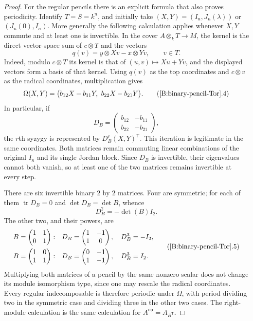 \begin{proof}
For the regular pencils there is an explicit formula that also
proves periodicity.  Identify $T=S=k^n$, and initially take
$(X,Y)=(I_n,J_n(\lambda))$ or $(J_n(0),I_n)$.
More generally the following calculation applies whenever $X,Y$
commute and at least one is invertible.  In the cover
$A\otimes_k T\to M$, the kernel is the direct vector-space sum
of $c\otimes T$ and the vectors
\[
 q(v)=y\otimes Xv-x\otimes Yv,\qquad v\in T.
\]
Indeed, modulo $c\otimes T$ its kernel is that of
$(u,v)\mapsto Xu+Yv$, and the displayed vectors form a basis
of that kernel.  Using $q(v)$ as the top coordinates and
$c\otimes v$ as the radical coordinates, multiplication gives
\[
 \Omega(X,Y)=
 \bigl(b_{12}X-b_{11}Y,\ b_{22}X-b_{21}Y\bigr).             \tag{\ref{B:binary-pencil-Tor}.4}\label{eq:B-binary-regular-syzygy}
\]
In particular, if
\[
 D_B=\begin{pmatrix}b_{12}&-b_{11}\\ b_{22}&-b_{21}\end{pmatrix},
\]
the $r$th syzygy is represented by $D_B^r(X,Y)^{\mathsf T}$.
This iteration is legitimate in the same coordinates.  Both
matrices remain commuting linear combinations of the original
$I_n$ and its single Jordan block.  Since $D_B$ is invertible,
their eigenvalues cannot both vanish, so at least one of the
two matrices remains invertible at every step.

There are six invertible binary $2$ by $2$ matrices.
Four are symmetric; for each of them
$\operatorname{tr}D_B=0$ and $\det D_B=\det B$, whence
\[
 D_B^2=-\det(B)I_2.
\]
The other two, and their powers, are
\[
\begin{split}
 B=\begin{pmatrix}1&1\\0&1\end{pmatrix}:&\quad
 D_B=\begin{pmatrix}1&-1\\1&0\end{pmatrix},\quad D_B^3=-I_2,\\
 B=\begin{pmatrix}1&0\\1&1\end{pmatrix}:&\quad
 D_B=\begin{pmatrix}0&-1\\1&-1\end{pmatrix},\quad D_B^3= I_2.
\end{split}                                               \tag{\ref{B:binary-pencil-Tor}.5}\label{eq:B-binary-periods}
\]
Multiplying both matrices of a pencil by the same nonzero
scalar does not change its module isomorphism type, since one
may rescale the radical coordinates.  Every regular
indecomposable is therefore periodic under $\Omega$, with
period dividing two in the symmetric case and dividing three
in the other two cases.  The right-module calculation is the
same calculation for $A^{\mathrm{op}}=A_{B^{\mathsf T}}$.


\end{proof}
